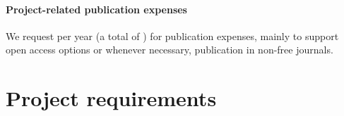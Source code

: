 \documentclass[10pt,fleqn,twoside]{article}
\newcommand{\missing}[1]{\textcolor{red}{\textbf{XXX #1 XXX}}}
\begin{document}
% 
% 
% 

\paragraph{Project-related publication expenses}

We request  per year (a total of ) for publication
expenses, mainly to support open access options or whenever necessary,
publication in non-free journals.

% 
% 
% 
% 
% 
% 
% 
% 
% 
% 

\section{Project requirements}
\end{document}
